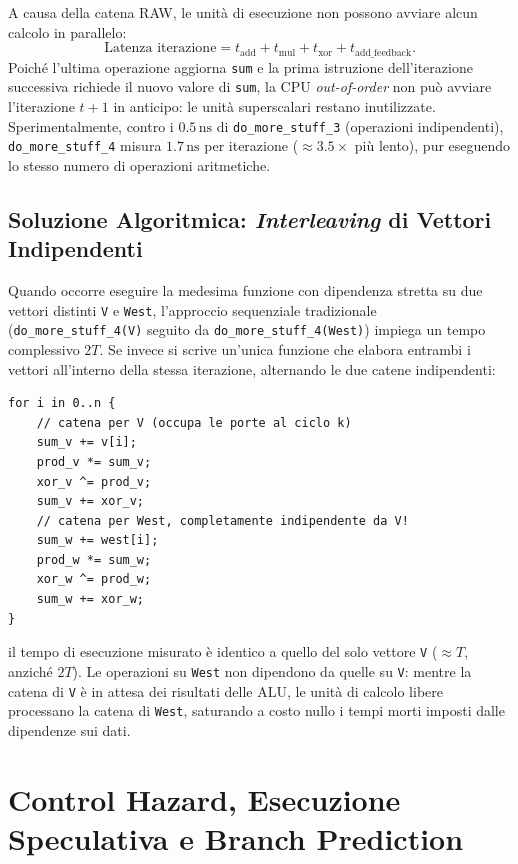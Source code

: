 A causa della catena RAW, le unit\`a di esecuzione non possono avviare alcun calcolo in parallelo:
\[
\text{Latenza iterazione} = t_{\text{add}} + t_{\text{mul}} + t_{\text{xor}} + t_{\text{add\_feedback}}.
\]
Poich\'e l'ultima operazione aggiorna \texttt{sum} e la prima istruzione dell'iterazione successiva richiede il nuovo valore di \texttt{sum}, la CPU \textit{out-of-order} non pu\`o avviare l'iterazione $t+1$ in anticipo: le unit\`a superscalari restano inutilizzate. Sperimentalmente, contro i $0.5\,\text{ns}$ di \texttt{do\_more\_stuff\_3} (operazioni indipendenti), \texttt{do\_more\_stuff\_4} misura $1.7\,\text{ns}$ per iterazione ($\approx 3.5\times$ pi\`u lento), pur eseguendo lo stesso numero di operazioni aritmetiche.

\subsection{Soluzione Algoritmica: \textit{Interleaving} di Vettori Indipendenti}

Quando occorre eseguire la medesima funzione con dipendenza stretta su due vettori distinti \texttt{V} e \texttt{West}, l'approccio sequenziale tradizionale (\texttt{do\_more\_stuff\_4(V)} seguito da \texttt{do\_more\_stuff\_4(West)}) impiega un tempo complessivo $2T$. Se invece si scrive un'unica funzione che elabora entrambi i vettori all'interno della stessa iterazione, alternando le due catene indipendenti:

\begin{lstlisting}[style=rustcode,caption={Fusione (interleaving) di due catene RAW indipendenti tra loro.}]
for i in 0..n {
    // catena per V (occupa le porte al ciclo k)
    sum_v += v[i];
    prod_v *= sum_v;
    xor_v ^= prod_v;
    sum_v += xor_v;
    // catena per West, completamente indipendente da V!
    sum_w += west[i];
    prod_w *= sum_w;
    xor_w ^= prod_w;
    sum_w += xor_w;
}
\end{lstlisting}

il tempo di esecuzione misurato \`e identico a quello del solo vettore \texttt{V} ($\approx T$, anzich\'e $2T$). Le operazioni su \texttt{West} non dipendono da quelle su \texttt{V}: mentre la catena di \texttt{V} \`e in attesa dei risultati delle ALU, le unit\`a di calcolo libere processano la catena di \texttt{West}, saturando a costo nullo i tempi morti imposti dalle dipendenze sui dati.

\FloatBarrier
\section{Control Hazard, Esecuzione Speculativa e Branch Prediction}

